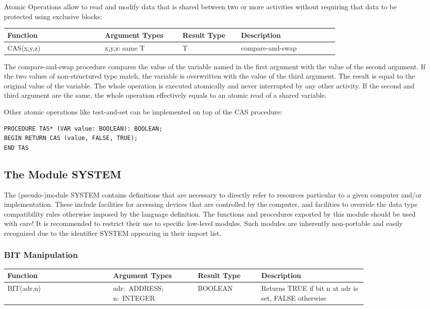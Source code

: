 \documentclass[a4wide,11pt]{article}
\begin{document}
Atomic Operations allow to read and modify data that is shared between two or more activities without requiring that data to be protected using exclusive blocks:

\begin{longtable}{|p{0.25\linewidth}|p{0.2\linewidth}|p{0.15\linewidth}|p{0.25\linewidth}|}
\hline
Function & Argument Types & Result Type & Description \\
\hline\hline
\endhead
CAS(x,y,z) & x,y,z: same T & T & compare-and-swap \\
\hline
\end{longtable}

The compare-and-swap procedure compares the value of the variable named in the first argument with the value of the second argument.
If the two values of non-structured type match, the variable is overwritten with the value of the third argument.
The result is equal to the original value of the variable.
The whole operation is executed atomically and never interrupted by any other activity.
If the second and third argument are the same, the whole operation effectively equals to an atomic read of a shared variable.

\begin{annotation}
Other atomic operations like test-and-set can be implemented on top of the CAS procedure:
\begin{lstlisting}[style=example]
PROCEDURE TAS* (VAR value: BOOLEAN): BOOLEAN;
BEGIN RETURN CAS (value, FALSE, TRUE);
END TAS
\end{lstlisting}

\end{annotation}

\subsection{The Module SYSTEM}
The (pseudo-)module SYSTEM contains definitions that are necessary to directly refer to resources particular to a given computer and/or implementation.
These include facilities for accessing devices that are controlled by the computer, and facilities to override the data type compatibility rules otherwise imposed by the language definition.
The functions and procedures exported by this module should be used with care! It is recommended to restrict their use to specific low-level modules.
Such modules are inherently non-portable and easily recognized due to the identifier SYSTEM appearing in their import list.


\subsubsection{BIT Manipulation}
\begin{longtable}{|p{0.25\linewidth}|p{0.2\linewidth}|p{0.15\linewidth}|p{0.25\linewidth}|}

\hline
Function & Argument Types & Result Type & Description \\
\hline\hline
\endhead
BIT(adr,n) & adr:~ADDRESS; n:~INTEGER & BOOLEAN & Returns TRUE if bit n at adr is set, FALSE otherwise \\
\hline
\end{longtable}
\end{document}
